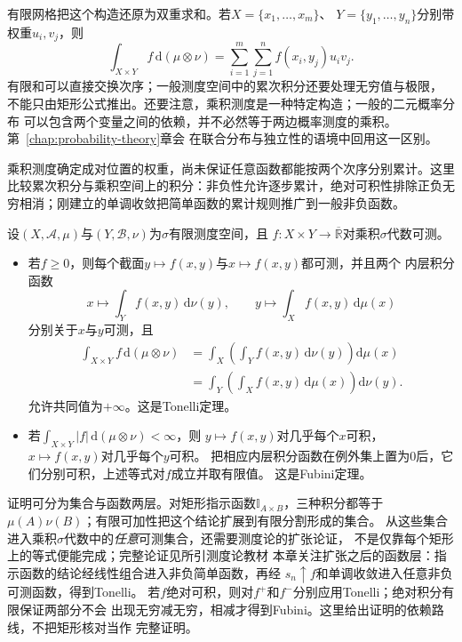 有限网格把这个构造还原为双重求和。若$X=\{x_1,\ldots,x_m\}$、
$Y=\{y_1,\ldots,y_n\}$分别带权重$u_i,v_j$，则
\[
  \int_{X\times Y}f\,\mathrm{d}(\mu\otimes\nu)
  =
  \sum_{i=1}^m\sum_{j=1}^n f(x_i,y_j)u_iv_j.
\]
有限和可以直接交换次序；一般测度空间中的累次积分还要处理无穷值与极限，
不能只由矩形公式推出。还要注意，乘积测度是一种特定构造；一般的二元概率分布
可以包含两个变量之间的依赖，并不必然等于两边概率测度的乘积。第~\ref{chap:probability-theory}章会
在联合分布与独立性的语境中回用这一区别。

乘积测度确定成对位置的权重，尚未保证任意函数都能按两个次序分别累计。这里比较累次积分与乘积空间上的积分：非负性允许逐步累计，绝对可积性排除正负无穷相消；刚建立的单调收敛把简单函数的累计规则推广到一般非负函数。
\begin{theorem}[Tonelli与Fubini定理]
\label{thm:analysis-tonelli-fubini}
设$(X,\mathcal{A},\mu)$与$(Y,\mathcal{B},\nu)$为$\sigma$有限测度空间，且 $f:X\times Y\to\overline{\mathbb{R}}$对乘积$\sigma$代数可测。
\begin{itemize}

\item 若$f\geq0$，则每个截面$y\mapsto f(x,y)$与$x\mapsto f(x,y)$都可测，并且两个
  内层积分函数
  \[
    x\longmapsto\int_Yf(x,y)\,\mathrm{d}\nu(y),
    \qquad
    y\longmapsto\int_Xf(x,y)\,\mathrm{d}\mu(x)
  \]
  分别关于$x$与$y$可测，且
  \[
    \begin{aligned}
      \int_{X\times Y}f\,\mathrm{d}(\mu\otimes\nu)
      &=
      \int_X\left(\int_Yf(x,y)\,\mathrm{d}\nu(y)\right)\mathrm{d}\mu(x)\\
      &=
      \int_Y\left(\int_Xf(x,y)\,\mathrm{d}\mu(x)\right)\mathrm{d}\nu(y).
    \end{aligned}
  \]
  允许共同值为$+\infty$。这是Tonelli定理。
\item 若$\int_{X\times Y}|f|\,\mathrm{d}(\mu\otimes\nu)<\infty$，则
  $y\mapsto f(x,y)$对几乎每个$x$可积，$x\mapsto f(x,y)$对几乎每个$y$可积。
  把相应内层积分函数在例外集上置为$0$后，它们分别可积，上述等式对$f$成立并取有限值。
  这是Fubini定理。
\end{itemize}
\end{theorem}

证明可分为集合与函数两层。对矩形指示函数$\mathbb I_{A\times B}$，三种积分都等于
$\mu(A)\nu(B)$；有限可加性把这个结论扩展到有限分割形成的集合。
从这些集合进入乘积$\sigma$代数中的\emph{任意}可测集合，还需要测度论的扩张论证，
不是仅靠每个矩形上的等式便能完成；完整论证见所引测度论教材
本章关注扩张之后的函数层：指示函数的结论经线性组合进入非负简单函数，再经
$s_n\uparrow f$和单调收敛进入任意非负可测函数，得到Tonelli。
若$f$绝对可积，则对$f^+$和$f^-$分别应用Tonelli；绝对积分有限保证两部分不会
出现无穷减无穷，相减才得到Fubini。这里给出证明的依赖路线，不把矩形核对当作
完整证明。

